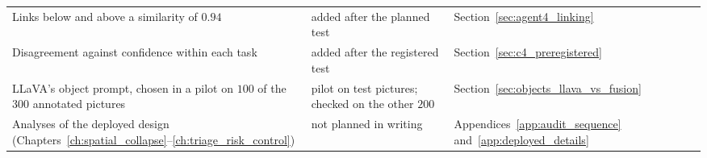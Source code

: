 \begin{table}[!htbp]
\begin{tabular}{>{\raggedright\arraybackslash}p{5.6cm} >{\raggedright\arraybackslash}p{2.6cm} >{\raggedright\arraybackslash}p{4.8cm}}
Links below and above a similarity of $0.94$ & added after the planned test & Section~\ref{sec:agent4_linking} \\
Disagreement against confidence within each task & added after the registered test & Section~\ref{sec:c4_preregistered} \\
LLaVA's object prompt, chosen in a pilot on $100$ of the $300$ annotated pictures & pilot on test pictures; checked on the other $200$ & Section~\ref{sec:objects_llava_vs_fusion} \\
Analyses of the deployed design (Chapters~\ref{ch:spatial_collapse}--\ref{ch:triage_risk_control}) & not planned in writing & Appendices~\ref{app:audit_sequence} and~\ref{app:deployed_details} \\
\bottomrule
\end{tabular}
\end{table}

